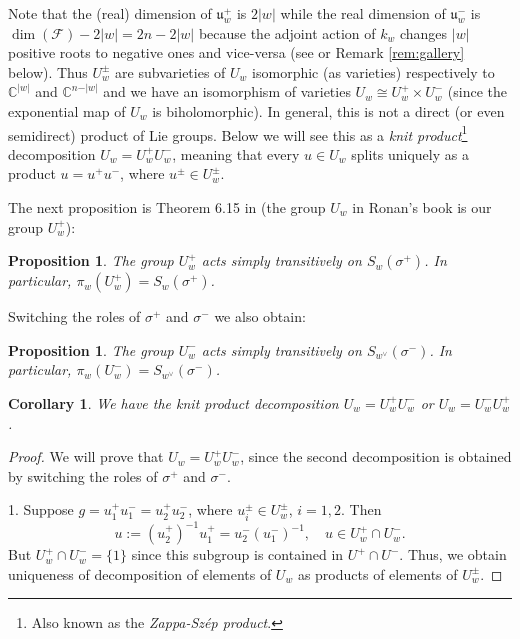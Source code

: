 \documentclass[12pt]{amsbook}%
\newtheorem{prop}[thm]{Proposition}
\newtheorem{cor}[thm]{Corollary}
\theoremstyle{definition}
\theoremstyle{remark}
\numberwithin{section}{chapter}
\numberwithin{subsection}{section}
\numberwithin{figure}{chapter}
\def\bC{{\mathbb{C}}}
\def\cF{{\mathscr{F}}}
\begin{document}
{{Note that the (real) dimension of $\mathfrak{u}_w^+$ is $2\vert w\vert$ while the real dimension of $\mathfrak{u}_w^-$ is 
$\dim(\cF)-2\vert w\vert= 2n- {2} \vert w\vert$ 
because the adjoint action of $k_w$ changes $\vert w\vert$ positive roots to negative ones and vice-versa 
(see \cite[the proof of Proposition 2.70]{knapp} or Remark \ref{rem:gallery} below). 
Thus $U_w^\pm$ are subvarieties of $U_w$ isomorphic (as varieties) respectively to 
$\bC^{\vert w\vert}$ and $\bC^{n-\vert w\vert}$ and we have an isomorphism of varieties 
$U_w\cong U_w^+\times U_w^-$ (since the exponential map of $U_w$ is  
biholomorphic). In general, this is not a direct (or even semidirect) product of Lie groups. Below we will see this as  
a {\em knit product}\footnote{Also known as the 
{\em Zappa-Sz\'ep product}.} decomposition $U_w= U_w^+ U_w^-$, meaning 
that every $u\in U_w$ splits uniquely as a product $u=u^+ u^-$, where $u^\pm\in U_w^\pm$. 

\medskip 
The next proposition is Theorem 6.15 in \cite{Ronan} (the group $U_w$ in Ronan's book is our group $U_w^+$): 

\begin{prop}\label{unipotentdescriptionofschubertcells1}
The group $U_w^+$ acts simply transitively on $S_w(\sigma^+)$. In particular, $\pi_w(U_w^+)=S_w(\sigma^+)$. 
\end{prop}

\medskip 
Switching the roles of $\sigma^+$ and $\sigma^-$ we also obtain: 

\begin{prop}\label{unipotentdescriptionofschubertcells2}
The group $U_w^-$ acts simply transitively on $S_{w^\vee}(\sigma^-)$. In particular, 
$\pi_w(U^-_w)= S_{w^\vee}(\sigma^-)$. 
\end{prop}


\begin{cor} \label{cor:knit}
We have the knit product decomposition 
$U_w= U_w^+ U_w^-$ or $U_w= U_w^- U_w^+$.
\end{cor}
\begin{proof} We will prove that $U_w= U_w^+ U_w^-$, since the second decomposition is obtained by switching the roles of $\sigma^+$ and $\sigma^-$.

1. Suppose $g=u_1^+ u_1^-=u_2^+u_2^-$, where $u_i^\pm\in U_w^\pm$, $i=1,2$. Then 
$$
u:=(u_2^+)^{-1}u_1^+ = u_2^- (u_1^-)^{-1}, \quad u \in U^+_w\cap U_w^-. 
$$
But $U^+_w\cap U_w^-=\{1\}$ since this subgroup is contained in $U^+\cap U^-$. 
Thus, we obtain uniqueness of decomposition of elements of $U_w$ as 
products of elements of $U_w^\pm$. 


\end{proof}}}
\end{document}
